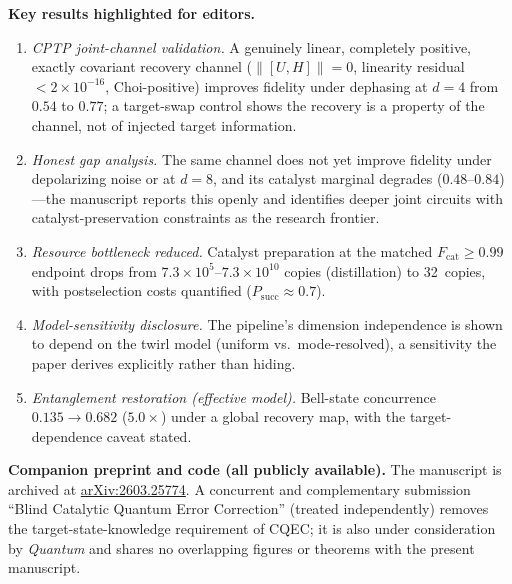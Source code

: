 \documentclass[11pt,a4paper]{article}
\begin{document}
\textbf{Key results highlighted for editors.}
\begin{enumerate}
\item \emph{CPTP joint-channel validation.} A genuinely linear, completely positive, exactly covariant recovery channel ($\|[U,H]\| = 0$, linearity residual $< 2 \times 10^{-16}$, Choi-positive) improves fidelity under dephasing at $d = 4$ from $0.54$ to $0.77$; a target-swap control shows the recovery is a property of the channel, not of injected target information.
\item \emph{Honest gap analysis.} The same channel does not yet improve fidelity under depolarizing noise or at $d = 8$, and its catalyst marginal degrades ($0.48$--$0.84$)---the manuscript reports this openly and identifies deeper joint circuits with catalyst-preservation constraints as the research frontier.
\item \emph{Resource bottleneck reduced.} Catalyst preparation at the matched $F_\mathrm{cat} \geq 0.99$ endpoint drops from $7.3 \times 10^{5}$--$7.3 \times 10^{10}$ copies (distillation) to 32~copies, with postselection costs quantified ($P_\mathrm{succ} \approx 0.7$).
\item \emph{Model-sensitivity disclosure.} The pipeline's dimension independence is shown to depend on the twirl model (uniform vs.\ mode-resolved), a sensitivity the paper derives explicitly rather than hiding.
\item \emph{Entanglement restoration (effective model).} Bell-state concurrence $0.135 \to 0.682$ ($5.0\times$) under a global recovery map, with the target-dependence caveat stated.
\end{enumerate}

\medskip

\textbf{Companion preprint and code (all publicly available).}
The manuscript is archived at \href{https://doi.org/10.48550/arXiv.2603.25774}{arXiv:2603.25774}.
A concurrent and complementary submission ``Blind Catalytic Quantum Error Correction'' (treated independently) removes the target-state-knowledge requirement of CQEC; it is also under consideration by \emph{Quantum} and shares no overlapping figures or theorems with the present manuscript.

\medskip
\end{document}
